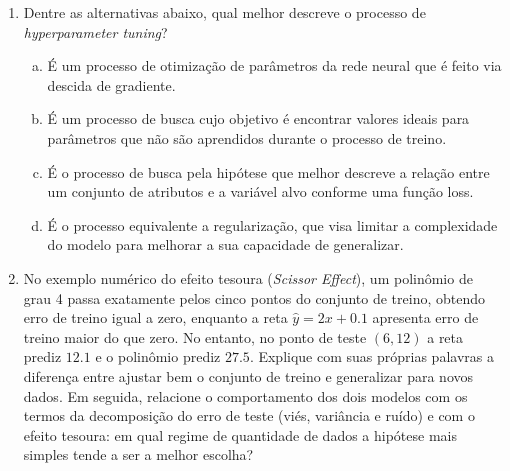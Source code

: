 \documentclass{dlproblemset}
\begin{document}
\begin{enumerate}[1)]
    \item Dentre as alternativas abaixo, qual melhor descreve o processo de \textit{hyperparameter tuning}?
    \begin{enumerate}[(a)]
	    \item É um processo de otimização de parâmetros da rede neural que é feito via descida de gradiente.
	    \item É um processo de busca cujo objetivo é encontrar valores ideais para parâmetros que não são aprendidos durante o processo de treino.
	    \item É o processo de busca pela hipótese que melhor descreve a relação entre um conjunto de atributos e a variável alvo conforme uma função loss.
	    \item É o processo equivalente a regularização, que visa limitar a complexidade do modelo para melhorar a sua capacidade de generalizar.
    \end{enumerate}

    \item No exemplo numérico do efeito tesoura (\textit{Scissor Effect}), um polinômio de grau 4 passa exatamente pelos cinco pontos do conjunto de treino, obtendo erro de treino igual a zero, enquanto a reta $\hat{y} = 2x + 0.1$ apresenta erro de treino maior do que zero. No entanto, no ponto de teste $(6, 12)$ a reta prediz $12.1$ e o polinômio prediz $27.5$. Explique com suas próprias palavras a diferença entre ajustar bem o conjunto de treino e generalizar para novos dados. Em seguida, relacione o comportamento dos dois modelos com os termos da decomposição do erro de teste (viés, variância e ruído) e com o efeito tesoura: em qual regime de quantidade de dados a hipótese mais simples tende a ser a melhor escolha?

\end{enumerate}

\newpage
\end{document}
